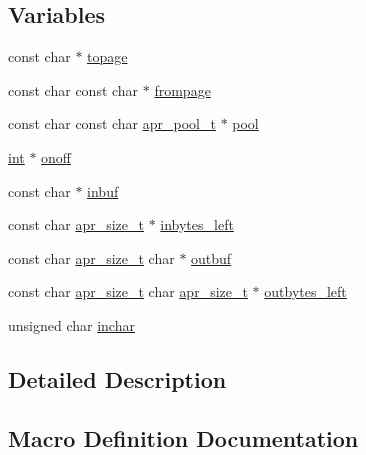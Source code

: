 \subsection*{Variables}
\begin{DoxyCompactItemize}
\item 
const char $\ast$ \hyperlink{group__APR__XLATE_ga9d36953130bf2d9095b125ce6612746b}{topage}
\item 
const char const char $\ast$ \hyperlink{group__APR__XLATE_ga532ae81fc0f00b2b4aa36337c714d832}{frompage}
\item 
const char const char \hyperlink{structapr__pool__t}{apr\+\_\+pool\+\_\+t} $\ast$ \hyperlink{group__APR__XLATE_gabb3cd978f04c73d0b763c391e9bfde73}{pool}
\item 
\hyperlink{pcre_8txt_a42dfa4ff673c82d8efe7144098fbc198}{int} $\ast$ \hyperlink{group__APR__XLATE_gafda021030ce868252ad6ee38170db18f}{onoff}
\item 
const char $\ast$ \hyperlink{group__APR__XLATE_gac9a519725a53acc7c9eb4e05a500e089}{inbuf}
\item 
const char \hyperlink{group__apr__platform_gaaa72b2253f6f3032cefea5712a27540e}{apr\+\_\+size\+\_\+t} $\ast$ \hyperlink{group__APR__XLATE_ga2f86284c0e279b847a1319f2074262bf}{inbytes\+\_\+left}
\item 
const char \hyperlink{group__apr__platform_gaaa72b2253f6f3032cefea5712a27540e}{apr\+\_\+size\+\_\+t} char $\ast$ \hyperlink{group__APR__XLATE_gac9a480cdf87742a4e756521e92b30e4d}{outbuf}
\item 
const char \hyperlink{group__apr__platform_gaaa72b2253f6f3032cefea5712a27540e}{apr\+\_\+size\+\_\+t} char \hyperlink{group__apr__platform_gaaa72b2253f6f3032cefea5712a27540e}{apr\+\_\+size\+\_\+t} $\ast$ \hyperlink{group__APR__XLATE_ga52d059f5a291f7a81d4403229554cf57}{outbytes\+\_\+left}
\item 
unsigned char \hyperlink{group__APR__XLATE_ga02341e1af7e26952bd04043006f39259}{inchar}
\end{DoxyCompactItemize}


\subsection{Detailed Description}


\subsection{Macro Definition Documentation}
